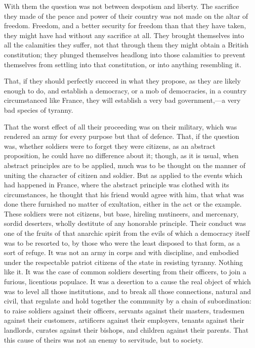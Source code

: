 With them the question was not between despotism and liberty. The sacrifice they made of the peace and power of their country was not made on the altar of freedom. Freedom, and a better security for freedom than that they have taken, they might have had without any sacrifice at all. They brought themselves into all the calamities they suffer, not that through them they might obtain a British constitution; they plunged themselves headlong into those calamities to prevent themselves from settling into that constitution, or into anything resembling it.

That, if they should perfectly succeed in what they propose, as they are likely enough to do, and establish a democracy, or a mob of democracies, in a country circumstanced like France, they will establish a very bad government,—a very bad species of tyranny.

That the worst effect of all their proceeding was on their military, which was rendered an army for every purpose but that of defence. That, if the question was, whether soldiers were to forget they were citizens, as an abstract proposition, he could have no difference about it; though, as it is usual, when abstract principles are to be applied, much was to be thought on the manner of uniting the character of citizen and soldier. But as applied to the events which had happened in France, where the abstract principle was clothed with its circumstances, he thought that his friend would agree with him, that what was done there furnished no matter of exultation, either in the act or the example. These soldiers were not citizens, but base, hireling mutineers, and mercenary, sordid deserters, wholly destitute of any honorable principle. Their conduct was one of the fruits of that anarchic spirit from the evils of which a democracy itself was to be resorted to, by those who were the least disposed to that form, as a sort of refuge. It was not an army in corps and with discipline, and embodied under the respectable patriot citizens of the state in resisting tyranny. Nothing like it. It was the case of common soldiers deserting from their officers, to join a furious, licentious populace. It was a desertion to a cause the real object of which was to level all those institutions, and to break all those connections, natural and civil, that regulate and hold together the community by a chain of subordination: to raise soldiers against their officers, servants against their masters, tradesmen against their customers, artificers against their employers, tenants against their landlords, curates against their bishops, and children against their parents. That this cause of theirs was not an enemy to servitude, but to society.

